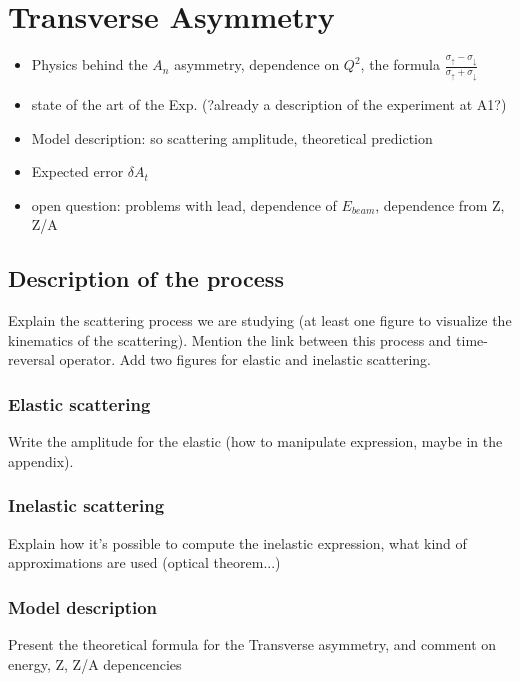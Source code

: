 
\chapter{Transverse Asymmetry} \label{transv}

\begin{itemize}

\item Physics behind the $A_{n}$ asymmetry, dependence on $Q^{2}$, the formula $\frac{\sigma_{\uparrow} - \sigma_{\downarrow}}{\sigma_{\uparrow} + \sigma_{\downarrow}}$
\item state of the art of the Exp. (?already a description of the experiment at A1?)
\item Model description: so scattering amplitude, theoretical prediction
\item Expected error $ \delta A_{t} $
\item open question: problems with lead, dependence of $E_{beam}$, dependence from Z, Z/A
\end{itemize}

\section{Description of the process}

Explain the scattering process we are studying (at least one figure to visualize the kinematics of the scattering). Mention the link between this process and time-reversal operator. Add two figures for elastic and inelastic scattering.

\subsection{Elastic scattering}

Write the amplitude for the elastic (how to manipulate expression, maybe in the appendix). 

\subsection{Inelastic scattering}

Explain how it's possible to compute the inelastic expression, what kind of approximations are used (optical theorem...) 

\subsection{Model description}
Present the theoretical formula for the Transverse asymmetry, and comment on energy, Z, Z/A depencencies

